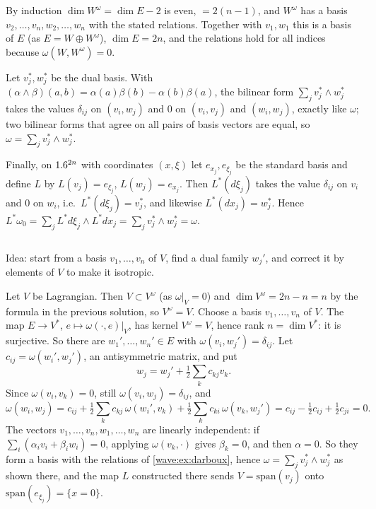 By induction $\dim W^\omega=\dim E-2$ is even, $=2(n-1)$, and $W^\omega$ has a basis
$v_2,\dots,v_n,w_2,\dots,w_n$ with the stated relations. Together with $v_1,w_1$ this is a
basis of $E$ (as $E=W\oplus W^\omega$), $\dim E=2n$, and the relations hold for all
indices because $\omega(W,W^\omega)=0$.

Let $v_j^*,w_j^*$ be the dual basis. With
$(\alpha\wedge\beta)(a,b)=\alpha(a)\beta(b)-\alpha(b)\beta(a)$, the bilinear form
$\sum_jv_j^*\wedge w_j^*$ takes the values $\delta_{ij}$ on $(v_i,w_j)$ and $0$ on $(v_i,v_j)$ and
$(w_i,w_j)$, exactly like $\omega$; two bilinear forms that agree on all pairs of basis
vectors are equal, so $\omega=\sum_jv_j^*\wedge w_j^*$.

Finally, on $1.6^{2n}$ with coordinates $(x,\xi)$ let $e_{x_j},e_{\xi_j}$ be the standard basis
and define $L$ by $L(v_j)=e_{\xi_j}$, $L(w_j)=e_{x_j}$. Then $L^*(d\xi_j)$ takes the value
$\delta_{ij}$ on $v_i$ and $0$ on $w_i$, i.e.\ $L^*(d\xi_j)=v_j^*$, and likewise
$L^*(dx_j)=w_j^*$. Hence $L^*\omega_0=\sum_jL^*d\xi_j\wedge L^*dx_j=\sum_jv_j^*\wedge w_j^*=\omega$.

\subsection*{}
Idea: start from a basis $v_1,\dots,v_n$ of $V$, find a dual family $w_j'$, and correct it
by elements of $V$ to make it isotropic.

Let $V$ be Lagrangian. Then $V\subset V^\omega$ (as $\omega|_V=0$) and $\dim V^\omega=2n-n=n$ by
the formula in the previous solution, so $V^\omega=V$. Choose a basis $v_1,\dots,v_n$ of $V$.
The map $E\to V^*$, $e\mapsto\omega(\cdot,e)|_V$, has kernel $V^\omega=V$, hence rank $n=\dim V^*$:
it is surjective. So there are $w_1',\dots,w_n'\in E$ with $\omega(v_i,w_j')=\delta_{ij}$. Let
$c_{ij}=\omega(w_i',w_j')$, an antisymmetric matrix, and put
\begin{equation*}
  w_j=w_j'+\tfrac12\sum_kc_{kj}v_k .
\end{equation*}
Since $\omega(v_i,v_k)=0$, still $\omega(v_i,w_j)=\delta_{ij}$, and
\begin{equation*}
  \omega(w_i,w_j)=c_{ij}+\tfrac12\sum_kc_{kj}\,\omega(w_i',v_k)+\tfrac12\sum_kc_{ki}\,\omega(v_k,w_j')
  =c_{ij}-\tfrac12c_{ij}+\tfrac12c_{ji}=0 .
\end{equation*}
The vectors $v_1,\dots,v_n,w_1,\dots,w_n$ are linearly independent: if
$\sum_i(\alpha_iv_i+\beta_iw_i)=0$, applying $\omega(v_k,\cdot)$ gives $\beta_k=0$, and then
$\alpha=0$. So they form a basis with the relations of \cref{wave:ex:darboux}, hence
$\omega=\sum_jv_j^*\wedge w_j^*$ as shown there, and the map $L$ constructed there sends
$V=\mathrm{span}(v_j)$ onto $\mathrm{span}(e_{\xi_j})=\{x=0\}$.

